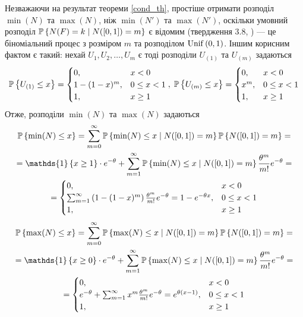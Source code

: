 Незважаючи на результат теореми \ref{cond_th}, простіше отримати розподіл
 $\min(N)$ та $\max(N)$, ніж $\min(N')$ та $\max(N')$,
оскільки умовний розподіл $\P{N(F) = k \mid N([0, 1]) = m}$ 
є відомим (твердження 3.8, \cite{last_penrose_2017}) --- це
біноміальний процес з {\color{red}розміром} $m$ та {\color{red}розподілом} $\Unif{0, 1}$.
Іншим корисним фактом є такий: нехай $U_1, U_2, \dots, U_m$ є
тоді розподіли $U_{(1)}$ та $U_{(m)}$ задаються
\begin{gather*}
    \P{U_{(1)} \leq x} = \begin{cases}
        0, & x < 0 \\
        1 - (1 - x)^m, & 0 \leq x < 1 \\
        1, & x \geq 1
    \end{cases}, \;
    \P{U_{(m)} \leq x} = \begin{cases}
        0, & x < 0 \\
        x^m, & 0 \leq x < 1 \\
        1, & x \geq 1
    \end{cases}
\end{gather*}
Отже, розподіли $\min(N)$ та $\max(N)$ задаються
\begin{gather}
    \P{\min(N) \leq x} = \sum_{m=0}^{\infty} \P{\min(N) \leq x \mid N([0, 1]) = m} \P{N([0, 1]) = m} = \\ \nonumber
     = \mathds{1}\left\{x\geq 1\right\}\cdot e^{-\theta} +
    \sum_{m=1}^{\infty} \P{\min(N) \leq x \mid N([0, 1]) = m} \frac{\theta^m}{m!} e^{-\theta} = \\ \nonumber
    = \begin{cases}
        0, & x< 0 \\
        \sum_{m=1}^{\infty} \left(1 - (1 - x)^m\right) \frac{\theta^m}{m!} e^{-\theta} = 1 - e^{-\theta x}, & 0 \leq x < 1 \\
        1, & x \geq 1
    \end{cases}
\end{gather}
\begin{gather}
    \P{\max(N) \leq x} = \sum_{m=0}^{\infty} \P{\max(N) \leq x \mid N([0, 1]) = m} \P{N([0, 1]) = m} = \\ \nonumber
     = \mathds{1}\left\{x\geq 0\right\}\cdot e^{-\theta} +
    \sum_{m=1}^{\infty} \P{\max(N) \leq x \mid N([0, 1]) = m} \frac{\theta^m}{m!} e^{-\theta} = \\ \nonumber
    = \begin{cases}
        0, & x< 0 \\
        e^{-\theta} + \sum_{m=1}^{\infty} x^m \frac{\theta^m}{m!} e^{-\theta} = e^{\theta(x-1)}, & 0 \leq x < 1 \\
        1, & x \geq 1
    \end{cases}
\end{gather}
